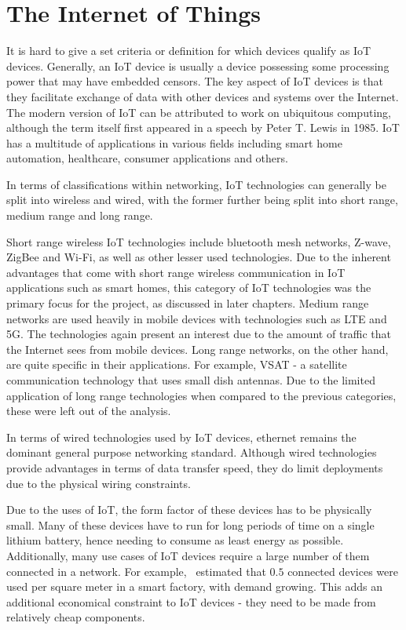 \section{The Internet of Things}

It is hard to give a set criteria or definition for which devices qualify as IoT devices.
Generally, an IoT device is usually a device possessing some processing power that may have embedded censors.
The key aspect of IoT devices is that they facilitate exchange of data with other devices and systems over the Internet.
The modern version of IoT can be attributed to work on ubiquitous computing, although the term itself first appeared in a speech by Peter T. Lewis in 1985.
IoT has a multitude of applications in various fields including smart home automation, healthcare, consumer applications and others.

In terms of classifications within networking, IoT technologies can generally be split into wireless and wired, with the former further being split into short range, medium range and long range.

Short range wireless IoT technologies include bluetooth mesh networks, Z-wave, ZigBee and Wi-Fi, as well as other lesser used technologies.
Due to the inherent advantages that come with short range wireless communication in IoT applications such as smart homes, this category of IoT technologies was the primary focus for the project, as discussed in later chapters.
Medium range networks are used heavily in mobile devices with technologies such as LTE and 5G.
The technologies again present an interest due to the amount of traffic that the Internet sees from mobile devices.
Long range networks, on the other hand, are quite specific in their applications.
For example, VSAT - a satellite communication technology that uses small dish antennas.
Due to the limited application of long range technologies when compared to the previous categories, these were left out of the analysis.

In terms of wired technologies used by IoT devices, ethernet remains the dominant general purpose networking standard.
Although wired technologies provide advantages in terms of data transfer speed, they do limit deployments due to the physical wiring constraints.

Due to the uses of IoT, the form factor of these devices has to be physically small.
Many of these devices have to run for long periods of time on a single lithium battery, hence needing to consume as least energy as possible.
Additionally, many use cases of IoT devices require a large number of them connected in a network.
For example,~\cite{ericsson_iot_2018} estimated that $0.5$ connected devices were used per square meter in a smart factory, with demand growing.
This adds an additional economical constraint to IoT devices - they need to be made from relatively cheap components.

